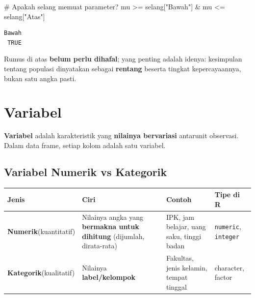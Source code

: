\documentclass[
  indonesian,
  letterpaper,
]{book}
\newenvironment{Shaded}{\begin{snugshade}}{\end{snugshade}}
\newcommand{\CommentTok}[1]{\textcolor[rgb]{0.37,0.37,0.37}{#1}}
\newcommand{\NormalTok}[1]{\textcolor[rgb]{0.00,0.23,0.31}{#1}}
\newcommand{\SpecialCharTok}[1]{\textcolor[rgb]{0.37,0.37,0.37}{#1}}
\newcommand{\StringTok}[1]{\textcolor[rgb]{0.13,0.47,0.30}{#1}}
\newcounter{none} %
\begin{document}
\begin{Shaded}
\begin{Highlighting}[]
\CommentTok{\# Apakah selang memuat parameter?}
\NormalTok{mu }\SpecialCharTok{\textgreater{}=}\NormalTok{ selang[}\StringTok{"Bawah"}\NormalTok{] }\SpecialCharTok{\&}\NormalTok{ mu }\SpecialCharTok{\textless{}=}\NormalTok{ selang[}\StringTok{"Atas"}\NormalTok{]}
\end{Highlighting}
\end{Shaded}

\begin{verbatim}
Bawah 
 TRUE 
\end{verbatim}

Rumus di atas \textbf{belum perlu dihafal}; yang penting adalah idenya:
kesimpulan tentang populasi dinyatakan sebagai \textbf{rentang} beserta
tingkat kepercayaannya, bukan satu angka pasti.

\section{Variabel}\label{variabel}

\textbf{Variabel} adalah karakteristik yang \textbf{nilainya bervariasi}
antarunit observasi. Dalam data frame, setiap kolom adalah satu
variabel.

\subsection{Variabel Numerik vs
Kategorik}\label{variabel-numerik-vs-kategorik}

{\def\LTcaptype{none} %
\begin{longtable}[]{@{}
  >{\raggedright\arraybackslash}p{}
  >{\raggedright\arraybackslash}p{}
  >{\raggedright\arraybackslash}p{}
  >{\raggedright\arraybackslash}p{}@{}}
\toprule\noalign{}
\begin{minipage}[b]{\linewidth}\raggedright
Jenis
\end{minipage} & \begin{minipage}[b]{\linewidth}\raggedright
Ciri
\end{minipage} & \begin{minipage}[b]{\linewidth}\raggedright
Contoh
\end{minipage} & \begin{minipage}[b]{\linewidth}\raggedright
Tipe di R
\end{minipage} \\
\midrule\noalign{}
\endhead
\bottomrule\noalign{}
\endlastfoot
\textbf{Numerik}(kuantitatif) & Nilainya angka yang \textbf{bermakna
untuk dihitung} (dijumlah, dirata-rata) & IPK, jam belajar, uang saku,
tinggi badan & \texttt{numeric}, \texttt{integer} \\
\textbf{Kategorik}(kualitatif) & Nilainya \textbf{label/kelompok} &
Fakultas, jenis kelamin, tempat tinggal & character, factor \\
\end{longtable}
}
\end{document}
